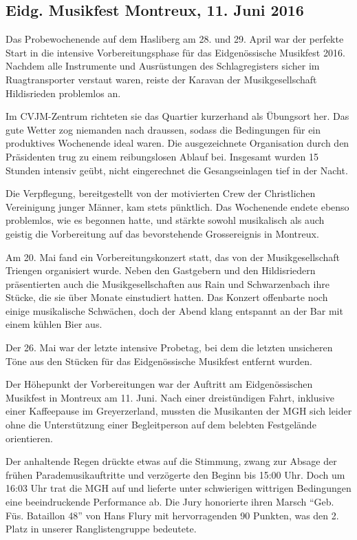 \subsection*{Eidg. Musikfest Montreux, 11. Juni 2016}

\begin{history}


    Das Probewochenende auf dem Hasliberg am 28. und 29. April war der perfekte
    Start in die intensive Vorbereitungsphase für das Eidgenössische Musikfest
    2016. Nachdem alle Instrumente und Ausrüstungen des Schlagregisters sicher
    im Ruagtransporter verstaut waren, reiste der Karavan der Musikgesellschaft
    Hildisrieden problemlos an.

    Im CVJM-Zentrum richteten sie das Quartier kurzerhand als Übungsort her. Das
    gute Wetter zog niemanden nach draussen, sodass die Bedingungen für ein
    produktives Wochenende ideal waren. Die ausgezeichnete Organisation durch
    den Präsidenten trug zu einem reibungslosen Ablauf bei. Insgesamt wurden 15
    Stunden intensiv geübt, nicht eingerechnet die Gesangseinlagen tief in der
    Nacht.

    Die Verpflegung, bereitgestellt von der motivierten Crew der Christlichen
    Vereinigung junger Männer, kam stets pünktlich. Das Wochenende endete ebenso
    problemlos, wie es begonnen hatte, und stärkte sowohl musikalisch als auch
    geistig die Vorbereitung auf das bevorstehende Grossereignis in Montreux.

    Am 20. Mai fand ein Vorbereitungskonzert statt, das von der
    Musikgesellschaft Triengen organisiert wurde. Neben den Gastgebern und den
    Hildisriedern präsentierten auch die Musikgesellschaften aus Rain und
    Schwarzenbach ihre Stücke, die sie über Monate einstudiert hatten. Das
    Konzert offenbarte noch einige musikalische Schwächen, doch der Abend klang
    entspannt an der Bar mit einem kühlen Bier aus.

    Der 26. Mai war der letzte intensive Probetag, bei dem die letzten
    unsicheren Töne aus den Stücken für das Eidgenössische Musikfest entfernt
    wurden.

    Der Höhepunkt der Vorbereitungen war der Auftritt am Eidgenössischen
    Musikfest in Montreux am 11. Juni. Nach einer dreistündigen Fahrt, inklusive
    einer Kaffeepause im Greyerzerland, mussten die Musikanten der MGH sich
    leider ohne die Unterstützung einer Begleitperson auf dem belebten
    Festgelände orientieren.

    Der anhaltende Regen drückte etwas auf die Stimmung, zwang zur Absage der
    frühen Parademusikauftritte und verzögerte den Beginn bis 15:00 Uhr. Doch um
    16:03 Uhr trat die MGH auf und lieferte unter schwierigen wittrigen
    Bedingungen eine beeindruckende Performance ab. Die Jury honorierte ihren
    Marsch \enquote{Geb. Füs. Bataillon 48} von Hans Flury mit hervorragenden 90
    Punkten, was den 2. Platz in unserer Ranglistengruppe bedeutete.


\end{history}
